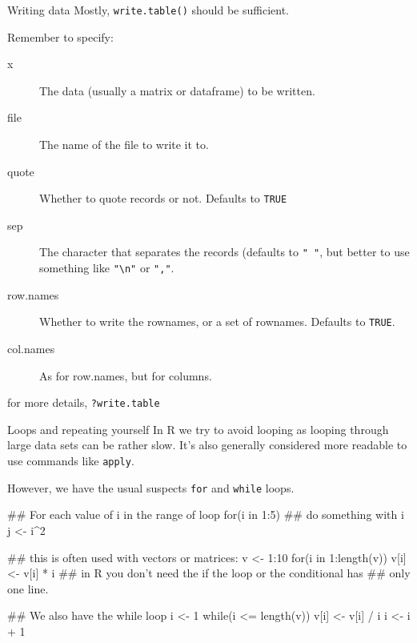 \documentclass[pdf]{beamer}
\begin{document}
\begin{frame}[fragile]{Writing data}
  Mostly, \texttt{write.table()} should be sufficient.
  
  Remember to specify:
  \begin{description}
  \item[x] The data (usually a matrix or dataframe) to be written.
  \item[file] The name of the file to write it to.
  \item[quote] Whether to quote records or not. Defaults to \texttt{TRUE}
  \item[sep] The character that separates the records (defaults to \texttt{"
    "}, but better to use something like \verb|"\n"| or \verb|","|.
  \item[row.names] Whether to write the rownames, 
    or a set of rownames. Defaults to \texttt{TRUE}.
  \item[col.names] As for row.names, but for columns.
  \end{description}

  for more details, \texttt{?write.table}
\end{frame}

\begin{frame}[fragile]{Loops and repeating yourself}
  In R we try to avoid looping as looping through large data
  sets can be rather slow. It's also generally considered
  more readable to use commands like \texttt{apply}.

  However, we have the usual suspects \texttt{for} and \texttt{while}
  loops.
  
  \begin{rcode}
    ## For each value of i in the range of loop
    for(i in 1:5){
      ## do something with i
      j <- i^2
    }
    
    ## this is often used with vectors or matrices:
    v <- 1:10
    for(i in 1:length(v))
       v[i] <- v[i] * i
    ## in R you don't need the {} if the loop or the conditional has
    ## only one line.
    
    ## We also have the while loop
    i <- 1
    while(i <= length(v)){
       v[i] <- v[i] / i
       i <- i + 1
    }
  \end{rcode}
\end{frame}
\end{document}
